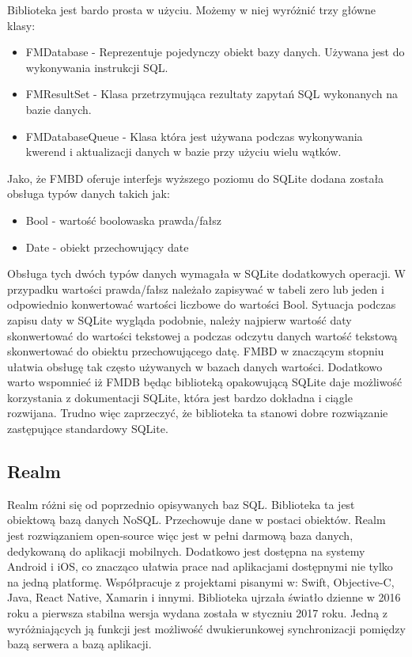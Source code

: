 Biblioteka jest bardo prosta w użyciu. Możemy w niej wyróżnić trzy główne klasy: 

\begin{itemize}
	\item  FMDatabase - Reprezentuje pojedynczy obiekt bazy danych. Używana jest do wykonywania instrukcji SQL. 
	\item FMResultSet - Klasa przetrzymująca rezultaty zapytań SQL wykonanych na bazie danych.
	\item FMDatabaseQueue - Klasa która jest używana podczas wykonywania kwerend i aktualizacji danych w bazie przy użyciu wielu wątków.
\end{itemize}

Jako, że FMBD oferuje interfejs wyższego poziomu do SQLite dodana została obsługa typów danych takich jak: 

\begin{itemize}
	\item Bool -  wartość boolowaska prawda/fałsz 
	\item Date - obiekt przechowujący date
\end{itemize}

Obsługa tych dwóch typów danych wymagała w SQLite dodatkowych operacji. W przypadku wartości prawda/fałsz należało zapisywać w tabeli zero lub jeden i odpowiednio konwertować wartości liczbowe do wartości Bool. Sytuacja podczas zapisu daty w SQLite wygląda podobnie, należy najpierw wartość daty skonwertować do wartości tekstowej a podczas odczytu danych wartość tekstową skonwertować do obiektu przechowującego datę. FMBD w znaczącym stopniu ułatwia obsługę tak często używanych w bazach danych wartości. Dodatkowo warto wspomnieć iż FMDB będąc biblioteką opakowującą SQLite daje możliwość korzystania z dokumentacji SQLite, która jest bardzo dokładna i ciągle rozwijana. Trudno więc zaprzeczyć, że biblioteka ta stanowi dobre rozwiązanie zastępujące standardowy SQLite. 

\subsection{Realm}

Realm różni się od poprzednio opisywanych baz SQL. Biblioteka ta jest obiektową bazą danych NoSQL. Przechowuje dane w postaci obiektów. Realm jest rozwiązaniem open-source więc jest w pełni darmową baza danych, dedykowaną do aplikacji mobilnych. Dodatkowo jest dostępna na systemy Android i iOS, co znacząco ułatwia prace nad aplikacjami dostępnymi nie tylko na jedną platformę. Współpracuje z projektami pisanymi w: Swift, Objective-C, Java, React Native, Xamarin i innymi. Biblioteka ujrzała światło dzienne w 2016 roku a pierwsza stabilna wersja wydana została w styczniu 2017 roku. Jedną z wyróżniających ją funkcji jest możliwość dwukierunkowej synchronizacji pomiędzy bazą serwera a bazą aplikacji.\par 

